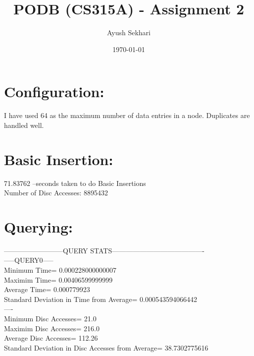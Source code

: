 \documentclass[12pt]{article}%
\begin{document}
\title{PODB (CS315A) - Assignment 2}
\author{Ayush Sekhari}
\date{\today}
\maketitle

\section{Configuration:}
I have used 64 as the maximum number of data entries in a node. 
Duplicates are handled well. 

\section{Basic Insertion:}
71.83762 --seconds taken to do Basic Insertions\\
Number of Disc Accesses: 8895432
\section{Querying:}
--------------------------QUERY STATS----------------------------------------\\
		-----QUERY0-----		\\
Minimum Time= 0.000228000000007\\
Maximim Time= 0.00406599999999\\
Average Time= 0.000779923\\
Standard Deviation in Time from Average= 0.000543594066442\\
----\\
Minimum Disc Accesses= 21.0\\
Maximim Disc Accesses= 216.0\\
Average Disc Accesses= 112.26\\
Standard Deviation in Disc Accesses from Average= 38.7302775616\\
\end{document}
